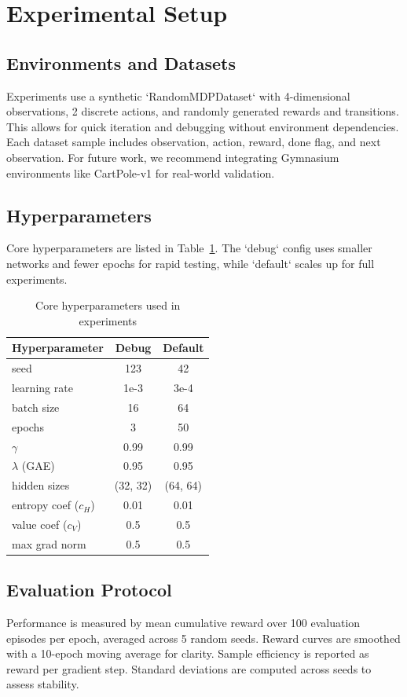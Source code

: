 \documentclass[11pt]{article}
\begin{document}
\section{Experimental Setup}
\subsection{Environments and Datasets}
Experiments use a synthetic `RandomMDPDataset` with 4-dimensional observations, 2 discrete actions, and randomly generated rewards and transitions. This allows for quick iteration and debugging without environment dependencies. Each dataset sample includes observation, action, reward, done flag, and next observation. For future work, we recommend integrating Gymnasium environments like CartPole-v1 for real-world validation.

\subsection{Hyperparameters}
Core hyperparameters are listed in Table~\ref{tab:hyperparams}. The `debug` config uses smaller networks and fewer epochs for rapid testing, while `default` scales up for full experiments.
\begin{table}[h]
\centering
\caption{Core hyperparameters used in experiments}
\label{tab:hyperparams}
\begin{tabular}{lcc}
\toprule
Hyperparameter & Debug & Default \\
\midrule
seed & 123 & 42 \\
learning rate & 1e-3 & 3e-4 \\
batch size & 16 & 64 \\
epochs & 3 & 50 \\
$\gamma$ & 0.99 & 0.99 \\
$\lambda$ (GAE) & 0.95 & 0.95 \\
hidden sizes & (32, 32) & (64, 64) \\
entropy coef ($c_H$) & 0.01 & 0.01 \\
value coef ($c_V$) & 0.5 & 0.5 \\
max grad norm & 0.5 & 0.5 \\
\bottomrule
\end{tabular}
\end{table}

\subsection{Evaluation Protocol}
Performance is measured by mean cumulative reward over 100 evaluation episodes per epoch, averaged across 5 random seeds. Reward curves are smoothed with a 10-epoch moving average for clarity. Sample efficiency is reported as reward per gradient step. Standard deviations are computed across seeds to assess stability.
\end{document}
